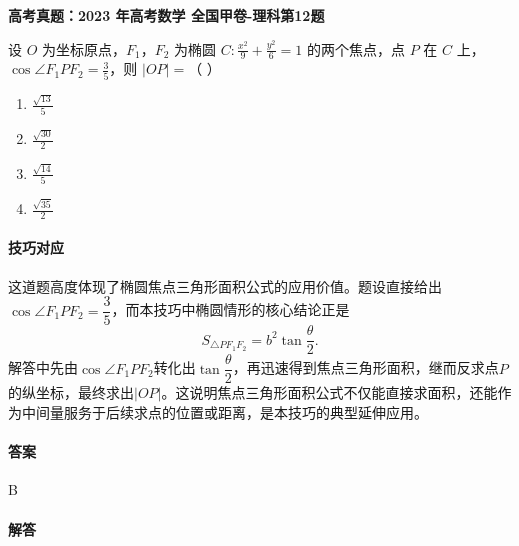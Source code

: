 \documentclass[UTF8,a4paper,11pt]{ctexart}
\newenvironment{gaokao}[1]{\par\medskip\noindent\textbf{高考真题：#1}\par\smallskip}{\par\medskip}
\begin{document}
\begin{gaokao}{2023 年高考数学 全国甲卷-理科第12题}

设 $O$ 为坐标原点，$F_1$，$F_2$ 为椭圆 $C: \frac{x^2}{9} + \frac{y^2}{6} = 1$ 的两个焦点，点 $P$ 在 $C$ 上，$\cos\angle F_1PF_2 = \frac{3}{5}$，则 $|OP| = $（         ）

\begin{enumerate}[label=\Alph*. ,itemsep=2pt]

\item $\frac{\sqrt{13}}{5}$

\item $\frac{\sqrt{30}}{2}$

\item $\frac{\sqrt{14}}{5}$

\item $\frac{\sqrt{35}}{2}$

\end{enumerate}

\paragraph{技巧对应}

这道题高度体现了椭圆焦点三角形面积公式的应用价值。题设直接给出$\cos\angle F_1PF_2=\dfrac35$，而本技巧中椭圆情形的核心结论正是
\[
S_{\triangle PF_1F_2}=b^2\tan\frac{\theta}{2}.
\]
解答中先由$\cos\angle F_1PF_2$转化出$\tan\dfrac{\theta}{2}$，再迅速得到焦点三角形面积，继而反求点$P$的纵坐标，最终求出$|OP|$。这说明焦点三角形面积公式不仅能直接求面积，还能作为中间量服务于后续求点的位置或距离，是本技巧的典型延伸应用。

\paragraph{答案}

B

\paragraph{解答}


\end{gaokao}
\end{document}
